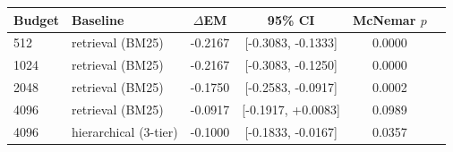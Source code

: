 \begin{tabular}{llcccc}
\toprule
Budget & Baseline & $\Delta$EM & 95\% CI & McNemar $p$ \\
\midrule
512 & retrieval (BM25) & -0.2167 & [-0.3083, -0.1333] & 0.0000 \\
1024 & retrieval (BM25) & -0.2167 & [-0.3083, -0.1250] & 0.0000 \\
2048 & retrieval (BM25) & -0.1750 & [-0.2583, -0.0917] & 0.0002 \\
4096 & retrieval (BM25) & -0.0917 & [-0.1917, +0.0083] & 0.0989 \\
4096 & hierarchical (3-tier) & -0.1000 & [-0.1833, -0.0167] & 0.0357 \\
\bottomrule
\end{tabular}